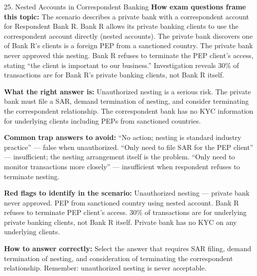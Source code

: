 \documentclass[11pt,a4paper]{beamer}
\begin{document}
	\begin{frame}{25. Nested Accounts in Correspondent Banking}
		\tiny
		\noindent\textbf{How exam questions frame this topic:} The scenario describes a private bank with a correspondent account for Respondent Bank R. Bank R allows its private banking clients to use the correspondent account directly (nested accounts). The private bank discovers one of Bank R's clients is a foreign PEP from a sanctioned country. The private bank never approved this nesting. Bank R refuses to terminate the PEP client's access, stating “the client is important to our business.” Investigation reveals 30\% of transactions are for Bank R's private banking clients, not Bank R itself.
		
		\vspace{0.1cm}
		\noindent\textbf{What the right answer is:} Unauthorized nesting is a serious risk. The private bank must file a SAR, demand termination of nesting, and consider terminating the correspondent relationship. The correspondent bank has no KYC information for underlying clients including PEPs from sanctioned countries.
		
		\vspace{0.1cm}
		\noindent\textbf{Common trap answers to avoid:} “No action; nesting is standard industry practice” — false when unauthorized. “Only need to file SAR for the PEP client” — insufficient; the nesting arrangement itself is the problem. “Only need to monitor transactions more closely” — insufficient when respondent refuses to terminate nesting.
		
		\vspace{0.1cm}
		\noindent\textbf{Red flags to identify in the scenario:} Unauthorized nesting — private bank never approved. PEP from sanctioned country using nested account. Bank R refuses to terminate PEP client's access. 30\% of transactions are for underlying private banking clients, not Bank R itself. Private bank has no KYC on any underlying clients.
		
		\vspace{0.1cm}
		\noindent\textbf{How to answer correctly:} Select the answer that requires SAR filing, demand termination of nesting, and consideration of terminating the correspondent relationship. Remember: unauthorized nesting is never acceptable.
	\end{frame}
	
\end{document}

